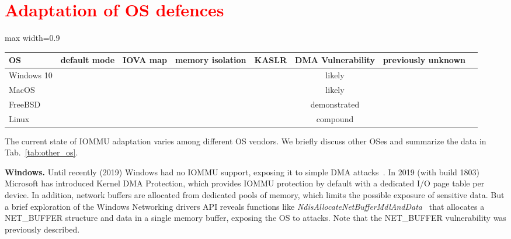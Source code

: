 
\section{\textcolor{red}{Adaptation of OS defences}}\label{sec:other_os}

\begin{table*}[t]
\begin{adjustbox}{max width=0.9\textwidth}
\begin{tabular}{l|ccccccc}
OS                           & default mode & IOVA map   & memory isolation    & KASLR &  DMA Vulnerability & previously unknown          \\ \hline

Windows 10  & \V   & \V & \X & \V   & likely        &    \\
MacOS       & \V   & \X & \X & \V   & likely        &    \\
FreeBSD     & \X   & \V & \X & \V   & demonstrated  &    \\
Linux       & \V   & \V & \X & \V   & compound      & \V \\\hline       
\end{tabular}
\end{adjustbox}
  \caption{IOMMU adaptation in different OS's.}
  \label{tab:other_os}
\end{table*}

The current state of IOMMU adaptation varies among different OS vendors. We briefly discuss other OSes and summarize the data in Tab.~\ref{tab:other_os}. 

\smallskip
\noindent\textbf{Windows.} Until recently (2019) Windows had no IOMMU support, exposing it to simple DMA attacks~\cite{thunder}.
In 2019 (with build 1803) Microsoft has introduced Kernel DMA Protection\cite{ms_iommu}, which provides IOMMU protection by default with a dedicated I/O page table per device. 
In addition, network buffers are allocated from dedicated pools of memory, which limits the possible exposure of sensitive data. But a brief exploration of the Windows Networking drivers API reveals functions like \emph{NdisAllocateNetBufferMdlAndData}~\cite{ms_single} that allocates a NET\_BUFFER structure and data in a single memory buffer, exposing the OS to \simple attacks. Note that the NET\_BUFFER vulnerability was previously described\cite{thunder}. 

